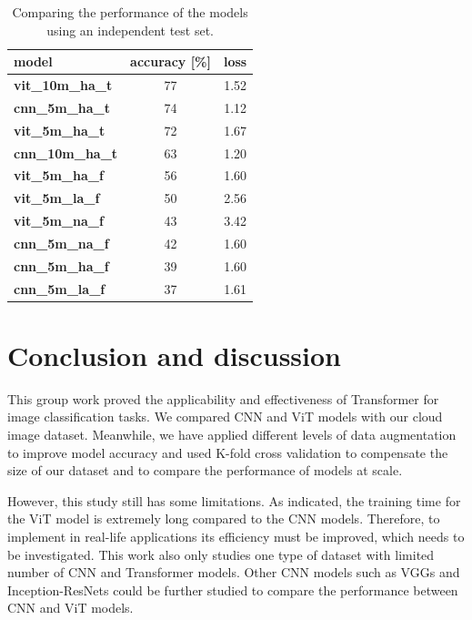 \documentclass{article}
\begin{document}
\begin{table}[]
\centering
\caption{Comparing the performance of the models using an independent test set.\label{tab:test_comp}}
\begin{tabular}{|l|c|c|}
\hline
\textbf{model} & \textbf{accuracy [\%]} & \textbf{loss} \\ \hline \hline
\textbf{vit\_10m\_ha\_t} & \num{77}                              & \num{1.52}                          \\
\textbf{cnn\_5m\_ha\_t}  & \num{74}                              & \num{1.12}                          \\
\textbf{vit\_5m\_ha\_t}  & \num{72}                              & \num{1.67}                          \\
\textbf{cnn\_10m\_ha\_t} & \num{63}                              & \num{1.20}     \\
\textbf{vit\_5m\_ha\_f}  & \num{56}                              & \num{1.60} \\
\textbf{vit\_5m\_la\_f}  & \num{50}                             & \num{2.56} \\
\textbf{vit\_5m\_na\_f}  & \num{43}                              & \num{3.42} \\
\textbf{cnn\_5m\_na\_f}  & \num{42}                              & \num{1.60} \\
\textbf{cnn\_5m\_ha\_f}  & \num{39}                              & \num{1.60} \\
\textbf{cnn\_5m\_la\_f}  & \num{37}                              & \num{1.61}
 \\ \hline
\end{tabular}
\end{table}

\section{Conclusion and discussion}
This group work proved the applicability and effectiveness of Transformer for image classification tasks. We compared CNN and ViT models with our cloud image dataset. Meanwhile, we have applied different levels of data augmentation to improve model accuracy and used K-fold cross validation to compensate the size of our dataset and to compare the performance of models at scale. 

However, this study still has some limitations. As indicated, the training time for the ViT model is extremely long compared to the CNN models. Therefore, to implement in real-life applications its efficiency must be improved, which needs to be investigated. This work also only studies one type of dataset with limited number of CNN and Transformer models. Other CNN models such as VGGs and Inception-ResNets could be further studied to compare the performance between CNN and ViT models. 

\FloatBarrier


	
\end{document}
